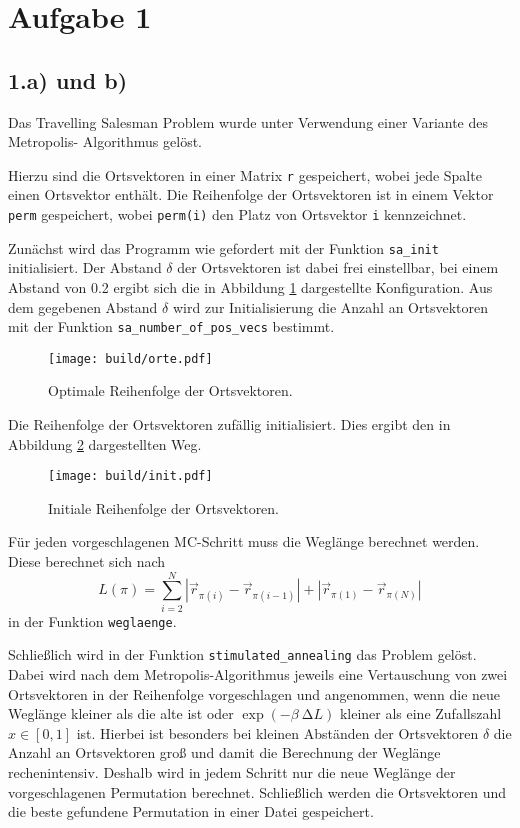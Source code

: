 \section*{Aufgabe 1}

\subsection*{1.a) und b)}
Das Travelling Salesman Problem wurde unter Verwendung einer Variante des Metropolis-
Algorithmus gelöst.

Hierzu sind die Ortsvektoren in einer Matrix \texttt{r} gespeichert, wobei jede
Spalte einen Ortsvektor enthält.
Die Reihenfolge der Ortsvektoren ist in einem Vektor \texttt{perm} gespeichert,
wobei \texttt{perm(i)} den Platz von Ortsvektor \texttt{i} kennzeichnet.

Zunächst wird das Programm wie gefordert mit der Funktion \texttt{sa\_init} initialisiert.
Der Abstand $\delta$ der Ortsvektoren ist dabei frei einstellbar, bei einem Abstand von
\num{0.2} ergibt sich die in Abbildung \ref{fig:orte} dargestellte Konfiguration.
Aus dem gegebenen Abstand $\delta$ wird zur Initialisierung die Anzahl an Ortsvektoren
mit der Funktion \texttt{sa\_number\_of\_pos\_vecs} bestimmt.
\begin{figure}
  \centering
  \texttt{[image: build/orte.pdf]}
  \caption{Optimale Reihenfolge der Ortsvektoren.}
  \label{fig:orte}
\end{figure}
Die Reihenfolge der Ortsvektoren zufällig initialisiert.
Dies ergibt den in Abbildung \ref{fig:init} dargestellten Weg.
\begin{figure}
  \centering
  \texttt{[image: build/init.pdf]}
  \caption{Initiale Reihenfolge der Ortsvektoren.}
  \label{fig:init}
\end{figure}

Für jeden vorgeschlagenen MC-Schritt muss die Weglänge berechnet werden.
Diese berechnet sich nach
\begin{equation*}
    L\!\left(\pi\right) =
    \sum_{i=2}^N \left|\vec{r}_{\pi\left(i\right)} - \vec{r}_{\pi\left(i-1\right)}\right|
    + \left|\vec{r}_{\pi\left(1\right)}-\vec{r}_{\pi\left(N\right)}\right|
\end{equation*}
in der Funktion \texttt{weglaenge}.

Schließlich wird in der Funktion \texttt{stimulated\_annealing} das Problem gelöst.
Dabei wird nach dem Metropolis-Algorithmus jeweils eine Vertauschung von zwei
Ortsvektoren in der Reihenfolge vorgeschlagen und angenommen,
wenn die neue Weglänge kleiner als die alte ist oder
$\exp\left(-\beta \: \increment L\right)$ kleiner als eine Zufallszahl
$x \in \left[0, 1\right]$ ist.
Hierbei ist besonders bei kleinen Abständen der Ortsvektoren $\delta$ die Anzahl an
Ortsvektoren groß und damit die Berechnung der Weglänge rechenintensiv.
Deshalb wird in jedem Schritt nur die neue Weglänge der vorgeschlagenen
Permutation berechnet.
Schließlich werden die Ortsvektoren und die beste gefundene Permutation in einer
Datei gespeichert.

